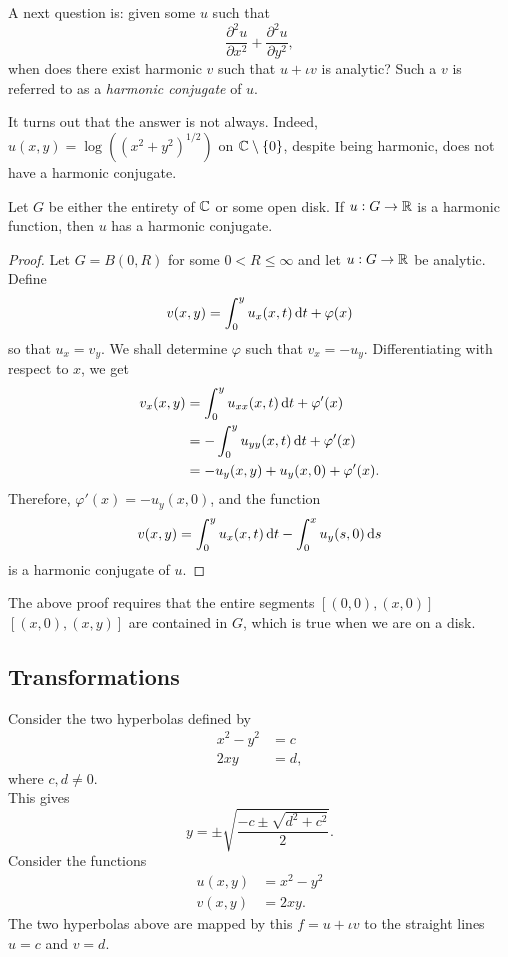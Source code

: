 	A next question is: given some $u$ such that
	\[ \frac{\partial^2 u}{\partial x^2} + \frac{\partial^2 u}{\partial y^2}, \]
	when does there exist harmonic $v$ such that $u + \iota v$ is analytic? Such a $v$ is referred to as a \emph{harmonic conjugate} of $u$.

	It turns out that the answer is not always. Indeed, $u(x,y) = \log((x^2+y^2)^{1/2})$ on $\mathbb{C}\setminus\{0\}$, despite being harmonic, does not have a harmonic conjugate.

	\begin{ftheo}
		Let $G$ be either the entirety of $\mathbb{C}$ or some open disk. If $u : G \to \mathbb{R}$ is a harmonic function, then $u$ has a harmonic conjugate.
	\end{ftheo}
	\begin{proof}
		Let $G = B(0,R)$ for some $0 < R \le \infty$ and let $u : G \to \mathbb{R}$ be analytic. Define
		\[ v(x,y) = \int_0^y u_x(x,t) \dif t + \varphi(x) \]
		so that $u_x = v_y$. We shall determine $\varphi$ such that $v_x = - u_y$. Differentiating with respect to $x$, we get
		\begin{align*}
			v_x(x,y) &= \int_0^y u_{xx}(x,t) \dif t + \varphi'(x) \\
				&= - \int_0^y u_{yy}(x,t) \dif t + \varphi'(x) \\
				&= - u_y(x,y) + u_y(x,0) + \varphi'(x).
		\end{align*}
		Therefore, $\varphi'(x) = - u_y(x,0)$, and the function
		\[ v(x,y) = \int_0^y u_x(x,t) \dif t - \int_0^x u_y(s,0) \dif s \]
		is a harmonic conjugate of $u$.
	\end{proof}

	The above proof requires that the entire segments $[(0,0),(x,0)]$ $[(x,0),(x,y)]$ are contained in $G$, which is true when we are on a disk.

\subsection{Transformations}

	Consider the two hyperbolas defined by
	\begin{align*}
		x^2-y^2 &= c \\
		2xy &= d,
	\end{align*}
	where $c,d \ne 0$.\\
	This gives
	\[ y = \pm \sqrt{ \frac{-c \pm \sqrt{d^2+c^2}}{2} }. \]
	Consider the functions
	\begin{align*}
		u(x,y) &= x^2 - y^2 \\
		v(x,y) &= 2xy.
	\end{align*}
	The two hyperbolas above are mapped by this $f = u + \iota v$ to the straight lines $u=c$ and $v=d$.\\

